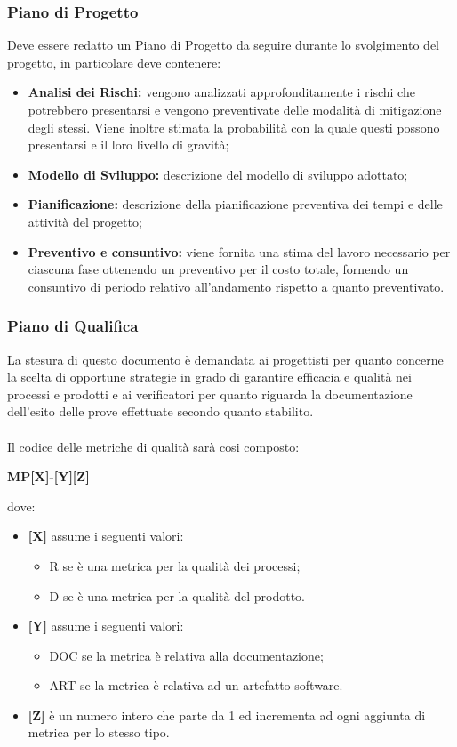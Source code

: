 \subsubsection{Piano di Progetto}
Deve essere redatto un Piano di Progetto da seguire durante lo svolgimento del progetto, in particolare deve contenere:

\begin{itemize}
  \item \textbf{Analisi dei Rischi:} vengono analizzati approfonditamente i rischi che potrebbero presentarsi e vengono preventivate delle modalità di mitigazione degli stessi. Viene inoltre stimata la probabilità con la quale questi possono presentarsi e il loro livello di gravità;
  \item \textbf{Modello di Sviluppo:} descrizione del modello di sviluppo adottato;
  \item \textbf{Pianificazione:} descrizione della pianificazione preventiva dei tempi e delle attività del progetto;
  \item \textbf{Preventivo e consuntivo:}  viene fornita una stima del lavoro necessario per ciascuna fase ottenendo un preventivo per il costo totale,  fornendo un consuntivo di periodo relativo all'andamento rispetto a quanto preventivato.
\end{itemize}

\subsubsection{Piano di Qualifica}
\label{_pianoDiQualifica}
La stesura di questo documento è demandata ai progettisti per quanto concerne la scelta di opportune strategie in grado di garantire efficacia e qualità nei processi e prodotti e ai verificatori per quanto riguarda la documentazione dell'esito delle prove effettuate secondo quanto stabilito. \\\\
Il codice delle metriche di qualità sarà cosi composto:
\begin{center}
  \textbf{MP[X]-[Y][Z]}
\end{center}
dove:
\begin{itemize}
  \item \textbf{[X]} assume i seguenti valori:
  \begin{itemize}
    \item R se è una metrica per la qualità dei processi;
    \item D se è una metrica per la qualità del prodotto.
  \end{itemize}
  \item \textbf{[Y]} assume i seguenti valori:
  \begin{itemize}
    \item DOC se la metrica è relativa alla documentazione;
    \item ART se la metrica è relativa ad un artefatto software.
  \end{itemize}
  \item \textbf{[Z]} è un numero intero che parte da 1 ed incrementa ad ogni aggiunta di metrica per lo stesso tipo.
\end{itemize}

